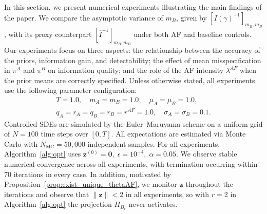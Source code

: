 \documentclass[letterpaper, 10 pt, conference]{ieeeconf}
\begin{document}
In this section, we present numerical experiments illustrating the main findings of the paper. We compare the asymptotic variance of \(m_B\), given by \([I(\gamma)^{-1}]_{m_B,m_B}\), with its proxy counterpart \([\overline{I}^{-1}]_{m_B,m_B}\) under both AF and baseline controls. Our experiments focus on three aspects: the relationship between the accuracy of the priors, information gain, and detectability; the effect of mean misspecification in \(\pi^A\) and \(\pi^B\) on information quality; and the role of the AF intensity \( \lambda^{AF}\) when the prior means are correctly specified. Unless otherwise stated, all experiments use the following parameter configuration:
\begin{gather*}
    T = 1.0,\quad m_A = m_B = 1.0, \quad \mu_A = \mu_B = 1.0, \\
    q_A = r_A = q_B = r_B = r^{AF} = 1.0, \quad \sigma_A = \sigma_B = 0.1. 
\end{gather*}
Controlled SDEs are simulated by the Euler--Maruyama scheme on a uniform grid of \(N=100\) time steps over \([0,T]\).  All expectations are estimated via Monte Carlo with $N_{\text{MC}}=50{,}000$ independent samples.  For all experiments, Algorithm~\ref{alg:opt} uses $\bm{z}^{(0)} = \bm{0}, \; \epsilon = 10^{-4}, \; \alpha = 0.05.$ We observe stable numerical convergence across all experiments, with termination occurring within 70 iterations in every case. In addition, motivated by Proposition~\ref{prop:exist_unique_thetaAF}, we monitor \(\bm z\) throughout the iterations and observe that \(\|\bm z\|<2\) in all experiments, so with $r=2$ in Algorithm~\ref{alg:opt} the projection $\Pi_{B_r}$ never activates.







\end{document}
